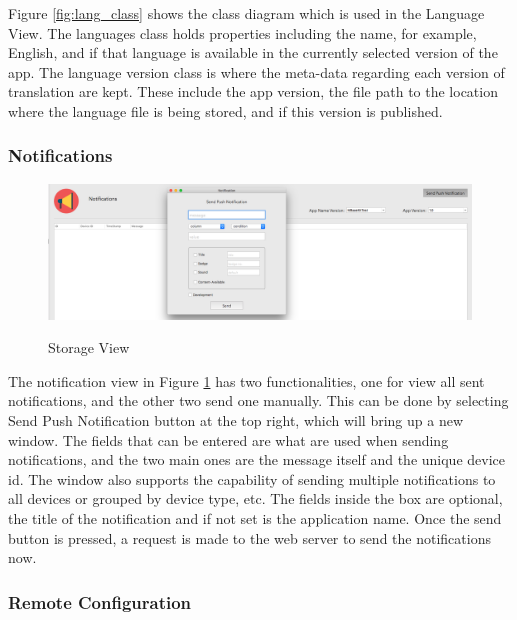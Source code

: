 Figure \ref{fig:lang_class} shows the class diagram which is used in the Language View. The languages class holds properties including the name, for example, English, and if that language is available in the currently selected version of the app. The language version class is where the meta-data regarding each version of translation are kept. These include the app version, the file path to the location where the language file is being stored, and if this version is published.

\subsubsection{Notifications}

\begin{figure}[!h]
    \caption{Storage View}
    \centering
    \includegraphics[width=120mm]{images/dashboard/notifications}
    \label{fig:notification}
\end{figure}

The notification view in Figure \ref{fig:notification} has two functionalities, one for view all sent notifications, and the other two send one manually. This can be done by selecting Send Push Notification button at the top right, which will bring up a new window. The fields that can be entered are what are used when sending notifications, and the two main ones are the message itself and the unique device id. The window also supports the capability of sending multiple notifications to all devices or grouped by device type, etc. The fields inside the box are optional, the title of the notification and if not set is the application name. Once the send button is pressed, a request is made to the web server to send the notifications now.

\subsubsection{Remote Configuration}

